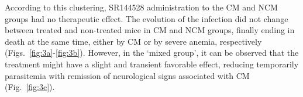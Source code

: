 \documentclass[empirical, authordate]{jote-new-article}
\begin{document}
According to this clustering, SR144528 administration to the CM and NCM groups had no therapeutic effect. The evolution of the infection did not change between treated and non-treated mice in CM and NCM groups, finally ending in death at the same time, either by CM or by severe anemia, respectively (Figs.~\ref{fig:3a}-\ref{fig:3b}). However, in the `mixed group', it can be observed that the treatment might have a slight and transient favorable effect, reducing temporarily parasitemia with remission of neurological signs associated with CM (Fig.~\ref{fig:3c}).


\begin{figure}[t]
  \begin{fullwidth}
    \raggedright
\end{fullwidth}
\end{figure}
\end{document}
